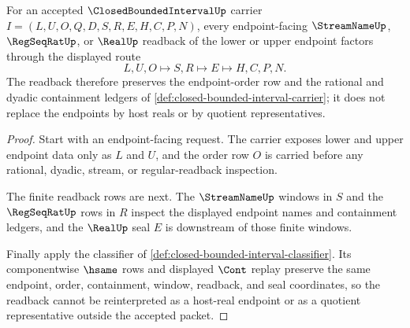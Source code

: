 \begin{theorem}
\label{thm:closed-bounded-interval-located-endpoint-readback}
For an accepted $\ClosedBoundedIntervalUp$ carrier $I=(L,U,O,Q,D,S,R,E,H,C,P,N)$, every endpoint-facing $\StreamNameUp$, $\RegSeqRatUp$, or $\RealUp$ readback of the lower or upper endpoint factors through the displayed route
$$
L,U,O \longmapsto S,R \longmapsto E \longmapsto H,C,P,N .
$$
The readback therefore preserves the endpoint-order row and the rational and dyadic containment ledgers of \autoref{def:closed-bounded-interval-carrier}; it does not replace the endpoints by host reals or by quotient representatives.
\end{theorem}
\begin{proof}
Start with an endpoint-facing request. The carrier exposes lower and upper endpoint data only as $L$ and $U$, and the order row $O$ is carried before any rational, dyadic, stream, or regular-readback inspection.

The finite readback rows are next. The $\StreamNameUp$ windows in $S$ and the $\RegSeqRatUp$ rows in $R$ inspect the displayed endpoint names and containment ledgers, and the $\RealUp$ seal $E$ is downstream of those finite windows.

Finally apply the classifier of \autoref{def:closed-bounded-interval-classifier}. Its componentwise $\hsame$ rows and displayed $\Cont$ replay preserve the same endpoint, order, containment, window, readback, and seal coordinates, so the readback cannot be reinterpreted as a host-real endpoint or as a quotient representative outside the accepted packet.
\end{proof}

